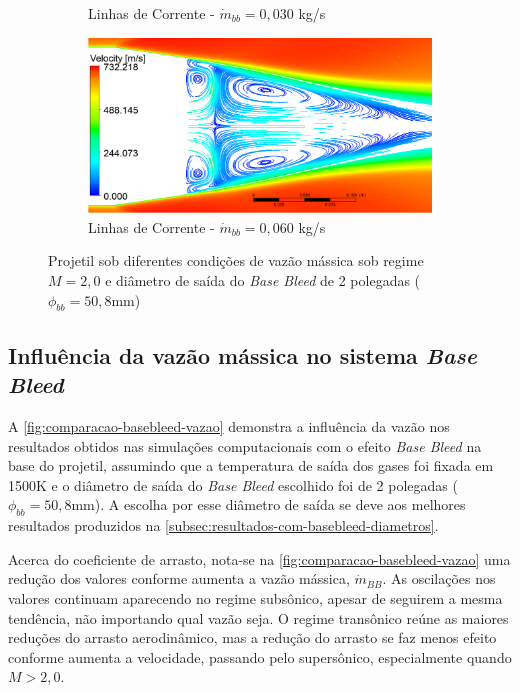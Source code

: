 \begin{figure}[!ht]
\begin{subfigure}[b]{0.47\textwidth}
        \caption{Linhas de Corrente - $\Dot{m}_{bb} = 0,030$ kg/s}
        \label{fig:corrente-velocidade-bb-2pol-vazao-0030}
    \end{subfigure}
    \hfill
    \begin{subfigure}[b]{0.47\textwidth}
        \centering
        \includegraphics[width=\textwidth]{corrente-velocidade-2306K-vazao-0060-2pol.png}
        \caption{Linhas de Corrente - $\Dot{m}_{bb} = 0,060$ kg/s}
	\label{fig:corrente-velocidade-bb-2pol-vazao-0060}
    \end{subfigure}
	\caption{Projetil sob diferentes condições de vazão mássica sob regime $M = 2,0$ e diâmetro de saída do \textit{Base Bleed} de 2 polegadas ($\phi_{bb} = 50,8 \unit{\mm}$)}
	\label{fig:influencia-diametro-vazao-2pol}
\end{figure}

\subsection{Influência da vazão mássica no sistema \textit{Base Bleed}} \label{subsec:resultados-com-basebleed-vazao}

A \autoref{fig:comparacao-basebleed-vazao} demonstra a influência da vazão nos resultados obtidos nas simulações computacionais com o efeito \textit{Base Bleed} na base do projetil, assumindo que a temperatura de saída dos gases foi fixada em 1500K e o diâmetro de saída do \textit{Base Bleed} escolhido foi de 2 polegadas ($\phi_{bb} = 50,8\unit{\mm}$). A escolha por esse diâmetro de saída se deve aos melhores resultados produzidos na \autoref{subsec:resultados-com-basebleed-diametros}.

Acerca do coeficiente de arrasto, nota-se na \autoref{fig:comparacao-basebleed-vazao} uma redução dos valores conforme aumenta a vazão mássica, $\Dot{m}_{BB}$. As oscilações nos valores continuam aparecendo no regime subsônico, apesar de seguirem a mesma tendência, não importando qual vazão seja. O regime transônico reúne as maiores reduções do arrasto aerodinâmico, mas a redução do arrasto se faz menos efeito conforme aumenta a velocidade, passando pelo supersônico, especialmente quando $M > 2,0$.

